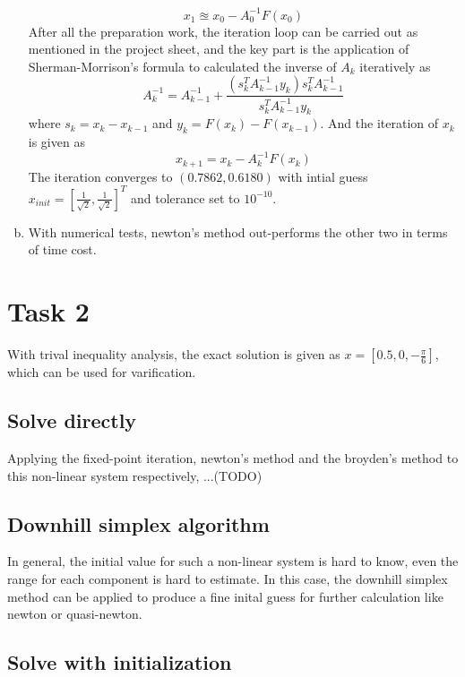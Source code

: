 \documentclass[paper=a4, fontsize=11pt]{scrartcl} %
\numberwithin{equation}{section} %
\numberwithin{figure}{section} %
\numberwithin{table}{section} %
\begin{document}
\begin{enumerate}[(a)]
			\begin{equation}
				x_1 \approxeq x_0 - A_0^{-1}F(x_0)
			\end{equation}
			After all the preparation work, the iteration loop can be carried out as mentioned in the project sheet, and the key part is the application of Sherman-Morrison's formula to calculated the inverse of $A_k$ iteratively as
			\begin{equation}
				A_k^{-1} = A_{k-1}^{-1} + \frac{(s_k^T A_{k-1}^{-1} y_k)s_k^T A_{k-1}^{-1}}{s_k^T A_{k-1}^{-1} y_k}
			\end{equation}
			where $s_k = x_k - x_{k-1}$ and $y_k = F(x_k) - F(x_{k-1})$. And the iteration of $x_k$ is given as
			\begin{equation}
				x_{k+1} = x_k - A_k^{-1}F(x_k)
			\end{equation}
			The iteration converges to $(0.7862, 0.6180)$ with intial guess $x_{init} = [\frac{1}{\sqrt{2}}, \frac{1}{\sqrt{2}}]^T$ and tolerance set to $10^{-10}$. 
		\item 
			With numerical tests, newton's method out-performs the other two in terms of time cost.
		
	\end{enumerate}

\section{Task 2}
	With trival inequality analysis, the exact solution is given as $x=[0.5, 0, -\frac{\pi}{6}]$, which can be used for varification.
	\subsection{Solve directly}
		Applying the fixed-point iteration, newton's method and the broyden's method to this non-linear system respectively, ...(TODO)
	\subsection{Downhill simplex algorithm}
	In general, the initial value for such a non-linear system is hard to know, even the range for each component is hard to estimate. In this case, the downhill simplex method can be applied to produce a fine inital guess for further calculation like newton or quasi-newton.
	\subsection{Solve with initialization}
	
\end{document}
